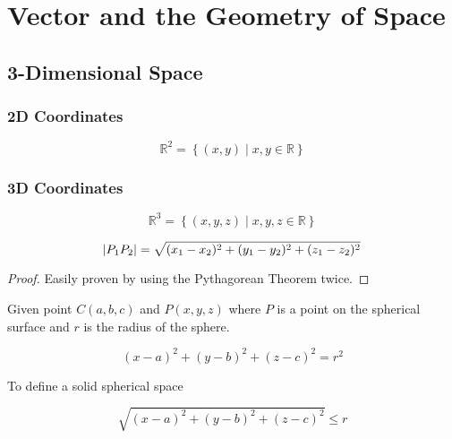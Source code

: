 \chapter{Vector and the Geometry of Space}

\section{3-Dimensional Space}

\subsection{2D Coordinates}

\begin{equation}
	\mathbb{R}^2 = \left\{(x,y) \mid x,y \in \mathbb{R}\right\}
\end{equation}

\subsection{3D Coordinates}

\begin{equation}
	\mathbb{R}^3 = \left\{(x,y,z) \mid x,y,z \in \mathbb{R}\right\}
\end{equation}

\begin{lemma}
	\begin{equation}
		\abs{P_1 P_2} = \sqrt{(x_1 - x_2)^2 + (y_1 - y_2)^2 + (z_1 - z_2)^2}
	\end{equation}
\end{lemma}

\begin{proof}
	Easily proven by using the Pythagorean Theorem twice.
\end{proof}

\begin{lemma}
	Given point $C(a,b,c)$ and $P(x,y,z)$ where $P$ is a point on the spherical surface and $r$ is the radius of the sphere.
	
	\begin{equation}
		(x - a)^2 + (y - b)^2 + (z - c)^2 = r^2
	\end{equation}

	To define a solid spherical space

	\begin{equation}
		\sqrt{(x - a)^2 + (y - b)^2 + (z - c)^2} \leq r
	\end{equation}
\end{lemma}

